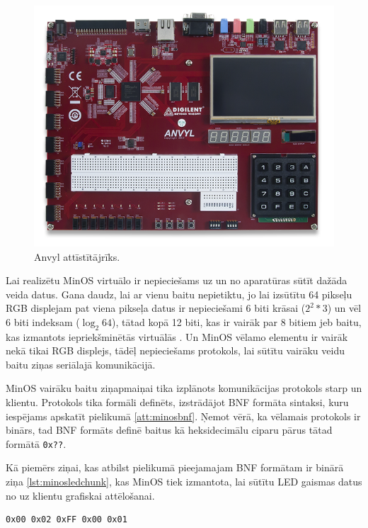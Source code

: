 \begin{figure}[H]
    \includegraphics[width=0.7\linewidth]{assets/anvyl.png}
    \centering
    \caption{Anvyl attīstītājrīks.}
    \label{fig:anvyl}
\end{figure}

Lai realizētu MinOS virtuālo  ir nepieciešams uz
un no aparatūras sūtīt dažāda veida datus. Gana daudz, lai ar vienu baitu
nepietiktu, jo lai izsūtītu 64 pikseļu RGB displejam pat viena pikseļa datus ir
nepieciešami 6 biti krāsai (\(2^2 * 3\)) un vēl 6 biti indeksam
(\(\log_{2}64\)), tātad kopā 12 biti, kas ir vairāk par 8 bitiem jeb baitu, kas
izmantots iepriekšminētās virtuālās . Un MinOS
 vēlamo elementu ir vairāk nekā tikai RGB
displejs, tādēļ nepieciešams protokols, lai sūtītu vairāku veidu baitu ziņas
seriālajā komunikācijā.

MinOS  vairāku baitu ziņapmaiņai tika izplānots
komunikācijas protokols starp  un klientu. Protokols
tika formāli definēts, izstrādājot BNF formāta sintaksi, kuru iespējams apskatīt
pielikumā \ref{att:minosbnf}. Ņemot vērā, ka vēlamais protokols ir binārs, tad
BNF formāts definē baitus kā heksidecimālu ciparu pārus tātad formātā
\lstinline!0x??!.

Kā piemērs ziņai, kas atbilst pielikumā pieejamajam BNF formātam ir binārā ziņa
\ref{lst:minosledchunk}, kas MinOS  tiek
izmantota, lai sūtītu LED gaismas datus no  uz
klientu grafiskai attēlošanai.

\begin{lstlisting}[caption={MinOS LED gaismu pakete},label={lst:minosledchunk},captionpos=b]
    0x00 0x02 0xFF 0x00 0x01 
\end{lstlisting}

